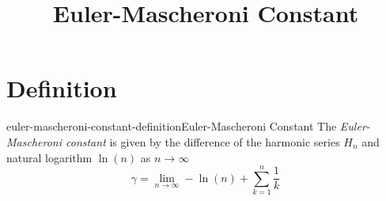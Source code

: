 \documentclass[preview]{standalone}
\begin{document}
\title{Euler-Mascheroni Constant}
\genpage

\section{Definition}

\begin{snippetdefinition}{euler-mascheroni-constant-definition}{Euler-Mascheroni Constant}{
    The \textit{Euler-Mascheroni constant} is given by the difference
    of the harmonic series \(H_n\) and natural logarithm \(\ln(n)\) as \(n\to \infty\)
    \[
        \gamma = \lim_{n\to\infty} -\ln(n)+\sum_{k=1}^{n}\frac{1}{k}
    \]
}
\end{snippetdefinition}
\end{document}
